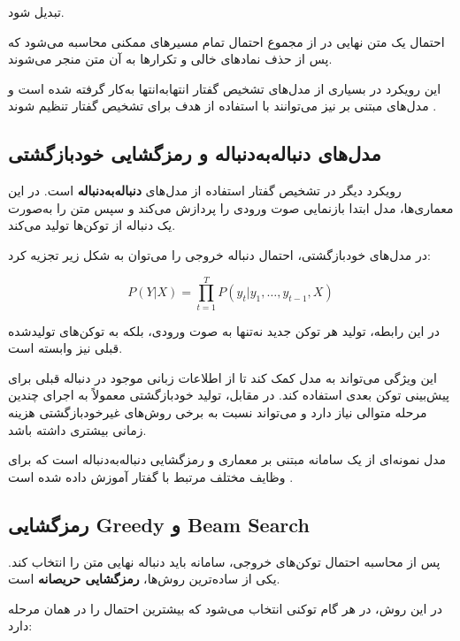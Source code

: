 تبدیل شود.

احتمال یک متن نهایی در  از مجموع احتمال تمام مسیرهای
ممکنی محاسبه می‌شود که پس از حذف نمادهای خالی و تکرارها به
آن متن منجر می‌شوند.

این رویکرد در بسیاری از مدل‌های تشخیص گفتار انتهابه‌انتها
به‌کار گرفته شده است و مدل‌های مبتنی بر 
نیز می‌توانند با استفاده از هدف  برای تشخیص گفتار
تنظیم شوند \cite{baevski2020wav2vec2}.


\subsection{مدل‌های دنباله‌به‌دنباله و رمزگشایی خودبازگشتی}

رویکرد دیگر در تشخیص گفتار استفاده از مدل‌های
\textbf{دنباله‌به‌دنباله}
است.
در این معماری‌ها، مدل ابتدا بازنمایی صوت ورودی را پردازش
می‌کند و سپس متن را به‌صورت یک دنباله از توکن‌ها تولید می‌کند.

در مدل‌های خودبازگشتی، احتمال دنباله خروجی را می‌توان به شکل
زیر تجزیه کرد:

\begin{equation}
P(Y|X)
=
\prod_{t=1}^{T}
P(y_t | y_1,\ldots,y_{t-1},X)
\end{equation}

در این رابطه، تولید هر توکن جدید نه‌تنها به صوت ورودی، بلکه
به توکن‌های تولیدشده قبلی نیز وابسته است.

این ویژگی می‌تواند به مدل کمک کند تا از اطلاعات زبانی موجود
در دنباله قبلی برای پیش‌بینی توکن بعدی استفاده کند.
در مقابل، تولید خودبازگشتی معمولاً به اجرای چندین مرحله متوالی
نیاز دارد و می‌تواند نسبت به برخی روش‌های غیرخودبازگشتی
هزینه زمانی بیشتری داشته باشد.

مدل  نمونه‌ای از یک سامانه مبتنی بر معماری
 و رمزگشایی دنباله‌به‌دنباله است که برای
وظایف مختلف مرتبط با گفتار آموزش داده شده است
\cite{radford2022whisper}.


\subsection{رمزگشایی Greedy و Beam Search}

پس از محاسبه احتمال توکن‌های خروجی، سامانه باید دنباله نهایی
متن را انتخاب کند.
یکی از ساده‌ترین روش‌ها،
\textbf{رمزگشایی حریصانه}
است.

در این روش، در هر گام توکنی انتخاب می‌شود که بیشترین احتمال
را در همان مرحله دارد:

